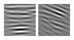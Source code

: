 \begin{figure}[ht]
\begin{center}
  \includegraphics[width=\columnwidth/9]{ch4/figures/real_2_4.jpg}
  \includegraphics[width=\columnwidth/9]{ch4/figures/real_2_5.jpg}

\end{center}
\end{figure}
